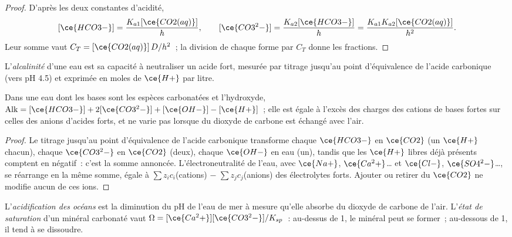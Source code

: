 \begin{proof}
D'après les deux constantes d'acidité,
\[
  [\ce{HCO3-}] = \frac{K_{a1}[\ce{CO2(aq)}]}{h}, \qquad [\ce{CO3^2-}] = \frac{K_{a2}[\ce{HCO3-}]}{h} = \frac{K_{a1}K_{a2}[\ce{CO2(aq)}]}{h^2}.
\]
Leur somme vaut $C_T = [\ce{CO2(aq)}]\,D/h^2$~; la division de chaque forme par $C_T$ donne les fractions.
\end{proof}

\begin{definition}[Alcalinité]\label{def:b3:environmental-toxicology:alkalinity}
L'\emph{alcalinité} d'une eau est sa capacité à neutraliser un
acide fort, mesurée par titrage jusqu'au point d'équivalence de l'acide
carbonique (vers pH 4.5) et exprimée en moles de $\ce{H+}$ par litre.
\end{definition}

\begin{proposition}\label{prop:b3:environmental-toxicology:alkalinity}
Dans une eau dont les bases sont les espèces carbonatées et l'hydroxyde,
$\mathrm{Alk} = [\ce{HCO3-}] + 2[\ce{CO3^2-}] + [\ce{OH-}] - [\ce{H+}]$~; elle est égale à l'excès des charges des cations de bases fortes
sur celles des anions d'acides forts, et ne varie pas lorsque du dioxyde de
carbone est échangé avec l'air.
\end{proposition}

\begin{proof}
Le titrage jusqu'au point d'équivalence de l'acide carbonique transforme chaque $\ce{HCO3-}$ en $\ce{CO2}$ (un $\ce{H+}$ chacun),
chaque $\ce{CO3^2-}$ en $\ce{CO2}$ (deux), chaque $\ce{OH-}$ en eau (un), tandis que les $\ce{H+}$ libres déjà présents
comptent en négatif~: c'est la somme annoncée. L'électroneutralité de
l'eau, avec
$\ce{Na+}$, $\ce{Ca^2+}$\dots{} et $\ce{Cl-}$, $\ce{SO4^2-}$\dots, se réarrange en la même somme, égale à $\sum z_i c_i$(cations) $-$ $\sum z_jc_j$(anions)
des électrolytes forts. Ajouter ou retirer du $\ce{CO2}$ ne modifie aucun de ces ions.
\end{proof}

\begin{definition}\label{def:b3:environmental-toxicology:acidification}
L'\emph{acidification des océans} est la diminution du
pH de l'eau de mer à mesure qu'elle absorbe du dioxyde de carbone de l'air.
L'\emph{état de saturation} d'un minéral carbonaté vaut
$\Omega = [\ce{Ca^2+}][\ce{CO3^2-}]/K_{sp}$~: au-dessus de 1, le minéral peut se former~; au-dessous de 1, il tend à se dissoudre.
\end{definition}

